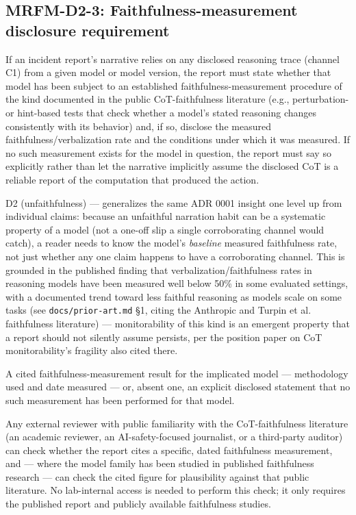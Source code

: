 \subsection*{MRFM-D2-3: Faithfulness-measurement disclosure requirement}
\begin{description}[leftmargin=2.2cm, style=nextline]
\item[Requirement] If an incident report's narrative relies on any disclosed reasoning trace (channel C1) from a given model or model version, the report must state whether that model has been subject to an established faithfulness-measurement procedure of the kind documented in the public CoT-faithfulness literature (e.g., perturbation- or hint-based tests that check whether a model's stated reasoning changes consistently with its behavior) and, if so, disclose the measured faithfulness/verbalization rate and the conditions under which it was measured. If no such measurement exists for the model in question, the report must say so explicitly rather than let the narrative implicitly assume the disclosed CoT is a reliable report of the computation that produced the action.
\item[Degradation defended] D2 (unfaithfulness) --- generalizes the same ADR 0001 insight one level up from individual claims: because an unfaithful narration habit can be a systematic property of a model (not a one-off slip a single corroborating channel would catch), a reader needs to know the model's \emph{baseline} measured faithfulness rate, not just whether any one claim happens to have a corroborating channel. This is grounded in the published finding that verbalization/faithfulness rates in reasoning models have been measured well below 50\% in some evaluated settings, with a documented trend toward less faithful reasoning as models scale on some tasks (see \texttt{docs/prior-art.md} \S{}1, citing the Anthropic and Turpin et al. faithfulness literature) --- monitorability of this kind is an emergent property that a report should not silently assume persists, per the position paper on CoT monitorability's fragility also cited there.
\item[Evidence required] A cited faithfulness-measurement result for the implicated model --- methodology used and date measured --- or, absent one, an explicit disclosed statement that no such measurement has been performed for that model.
\item[Verifier (no lab network access needed)] Any external reviewer with public familiarity with the CoT-faithfulness literature (an academic reviewer, an AI-safety-focused journalist, or a third-party auditor) can check whether the report cites a specific, dated faithfulness measurement, and --- where the model family has been studied in published faithfulness research --- can check the cited figure for plausibility against that public literature. No lab-internal access is needed to perform this check; it only requires the published report and publicly available faithfulness studies.

\end{description}
